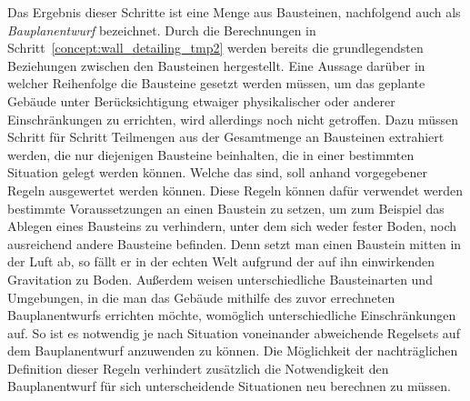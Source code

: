 Das Ergebnis dieser Schritte ist eine Menge aus Bausteinen, nachfolgend auch als \textit{Bauplanentwurf} bezeichnet.
Durch die Berechnungen in Schritt~\ref{concept:wall_detailing_tmp2} werden bereits die grundlegendsten Beziehungen zwischen den Bausteinen hergestellt.
Eine Aussage darüber in welcher Reihenfolge die Bausteine gesetzt werden müssen, um das geplante Gebäude unter Berücksichtigung etwaiger physikalischer oder anderer Einschränkungen zu errichten, wird allerdings noch nicht getroffen.
Dazu müssen Schritt für Schritt Teilmengen aus der Gesamtmenge an Bausteinen extrahiert werden, die nur diejenigen Bausteine beinhalten, die in einer bestimmten Situation gelegt werden können.
Welche das sind, soll anhand vorgegebener Regeln ausgewertet werden können.
Diese Regeln können dafür verwendet werden bestimmte Voraussetzungen an einen Baustein zu setzen, um zum Beispiel das Ablegen eines Bausteins zu verhindern, unter dem sich weder fester Boden, noch ausreichend andere Bausteine befinden.
Denn setzt man einen Baustein mitten in der Luft ab, so fällt er in der echten Welt aufgrund der auf ihn einwirkenden Gravitation zu Boden.
Außerdem weisen unterschiedliche Bausteinarten und Umgebungen, in die man das Gebäude mithilfe des zuvor errechneten Bauplanentwurfs errichten möchte, womöglich unterschiedliche Einschränkungen auf.
So ist es notwendig je nach Situation voneinander abweichende Regelsets auf dem Bauplanentwurf anzuwenden zu können.
Die Möglichkeit der nachträglichen Definition dieser Regeln verhindert zusätzlich die Notwendigkeit den Bauplanentwurf für sich unterscheidende Situationen neu berechnen zu müssen.

